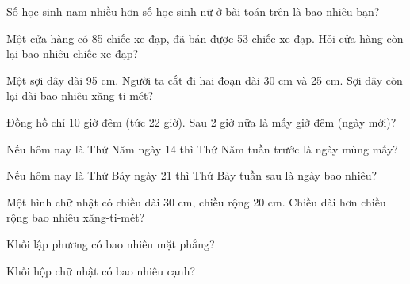 \begin{ex}
Số học sinh nam nhiều hơn số học sinh nữ ở bài toán trên là bao nhiêu bạn?
\end{ex}

\begin{ex}
Một cửa hàng có 85 chiếc xe đạp, đã bán được 53 chiếc xe đạp. Hỏi cửa hàng còn lại bao nhiêu chiếc xe đạp?
\end{ex}

\begin{ex}
Một sợi dây dài 95 cm. Người ta cắt đi hai đoạn dài 30 cm và 25 cm. Sợi dây còn lại dài bao nhiêu xăng-ti-mét?
\end{ex}

\begin{ex}
Đồng hồ chỉ 10 giờ đêm (tức 22 giờ). Sau 2 giờ nữa là mấy giờ đêm (ngày mới)?
\end{ex}

\begin{ex}
Nếu hôm nay là Thứ Năm ngày 14 thì Thứ Năm tuần trước là ngày mùng mấy?
\end{ex}

\begin{ex}
Nếu hôm nay là Thứ Bảy ngày 21 thì Thứ Bảy tuần sau là ngày bao nhiêu?
\end{ex}

\begin{ex}
Một hình chữ nhật có chiều dài 30 cm, chiều rộng 20 cm. Chiều dài hơn chiều rộng bao nhiêu xăng-ti-mét?
\end{ex}

\begin{ex}
Khối lập phương có bao nhiêu mặt phẳng?
\end{ex}

\begin{ex}
Khối hộp chữ nhật có bao nhiêu cạnh?
\end{ex}

